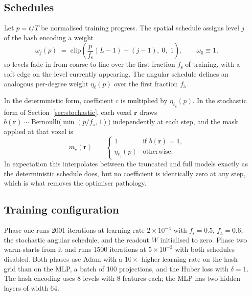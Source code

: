\documentclass[11pt,a4paper]{article}
\newcommand{\rvec}{\boldsymbol{r}}
\begin{document}
\subsection{Schedules}

Let $p = t/T$ be normalised training progress. The spatial schedule assigns level $j$ of
the hash encoding a weight
\begin{equation}
\omega_j(p) \;=\; \mathrm{clip}\!\left( \frac{p}{f_{\mathrm{s}}}(L-1) - (j-1),\; 0,\; 1 \right),
\qquad \omega_0 \equiv 1,
\end{equation}
so levels fade in from coarse to fine over the first fraction $f_{\mathrm{s}}$ of training,
with a soft edge on the level currently appearing. The angular schedule defines an
analogous per-degree weight $\eta_\ell(p)$ over the first fraction $f_{\mathrm{a}}$.

In the deterministic form, coefficient $c$ is multiplied by $\eta_{\ell_c}(p)$. In the
stochastic form of Section~\ref{sec:stochastic}, each voxel $\rvec$ draws
$b(\rvec) \sim \mathrm{Bernoulli}\big(\min(p/f_{\mathrm{a}}, 1)\big)$ independently at each
step, and the mask applied at that voxel is
\begin{equation}
m_c(\rvec) \;=\;
\begin{cases}
1 & \text{if } b(\rvec)=1,\\
\eta_{\ell_c}(p) & \text{otherwise.}
\end{cases}
\end{equation}
In expectation this interpolates between the truncated and full models exactly as the
deterministic schedule does, but no coefficient is identically zero at any step, which is
what removes the optimiser pathology.

\subsection{Training configuration}

Phase one runs 2001 iterations at learning rate $2\times10^{-4}$ with
$f_{\mathrm{s}}=0.5$, $f_{\mathrm{a}}=0.6$, the stochastic angular schedule, and the readout
$W$ initialised to zero. Phase two warm-starts from it and runs 1500 iterations at
$5\times10^{-3}$ with both schedules disabled. Both phases use Adam
\citep{Kingma2015} with a $10\times$ higher learning rate on the hash grid than on the MLP,
a batch of 100 projections, and the Huber loss with $\delta=1$. The hash encoding uses 8
levels with 8 features each; the MLP has two hidden layers of width 64.
\end{document}
